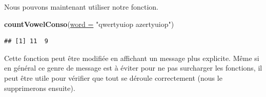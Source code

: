 \documentclass[twoside,symmetric]{book}
\newenvironment{Shaded}{}{}
\newcommand{\ControlFlowTok}[1]{\textbf{#1}}
\newcommand{\DataTypeTok}[1]{\underline{#1}}
\newcommand{\DecValTok}[1]{#1}
\newcommand{\KeywordTok}[1]{\textbf{#1}}
\newcommand{\NormalTok}[1]{#1}
\newcommand{\OperatorTok}[1]{#1}
\newcommand{\StringTok}[1]{#1}
\begin{document}
\begin{Shaded}
\end{Shaded}

Nous pouvons maintenant utiliser notre fonction.

\begin{Shaded}
\begin{Highlighting}[]
\KeywordTok{countVowelConso}\NormalTok{(}\DataTypeTok{word =} \StringTok{"qwertyuiop azertyuiop"}\NormalTok{)}
\end{Highlighting}
\end{Shaded}

\begin{verbatim}
## [1] 11  9
\end{verbatim}

Cette fonction peut être modifiée en affichant un message plus explicite. Même si en général ce genre de message est à éviter pour ne pas surcharger les fonctions, il peut être utile pour vérifier que tout se déroule correctement (nous le supprimerons ensuite).
\end{document}
